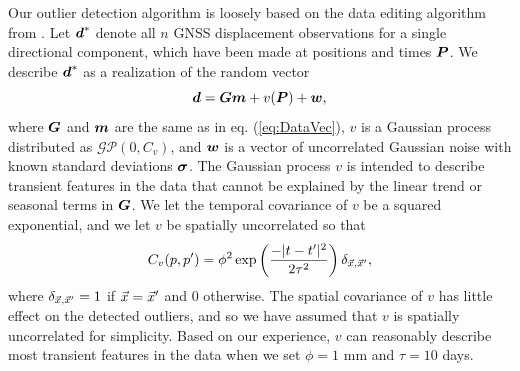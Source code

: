 \documentclass[extra,mreferee]{gji}
\begin{document}
Our outlier detection algorithm is loosely based on the data editing
algorithm from \citet{Acheson1975}. Let $\data^*$ denote all $n$ GNSS
displacement observations for a single directional component, which
have been made at positions and times $\points$.  We describe
$\data^*$ as a realization of the random vector
\begin{equation}\label{eq:OutlierDataVec}
\data = \G\mitbf{m} + v(\points) + \mitbf{w},
\end{equation}
where $\G$ and $\mitbf{m}$ are the same as in eq. (\ref{eq:DataVec}),
$v$ is a Gaussian process distributed as $\mathcal{GP}(0,C_v)$, and
$\mitbf{w}$ is a vector of uncorrelated Gaussian noise with known
standard deviations $\mitbf{\sigma}$. The Gaussian process $v$ is
intended to describe transient features in the data that cannot be
explained by the linear trend or seasonal terms in $\G$. We let the
temporal covariance of $v$ be a squared exponential, and we let $v$ be
spatially uncorrelated so that
\begin{equation}
C_v(p,p') = \phi^2\exp\left(\frac{-|t - t'|^2}{2\tau^2}\right) \delta_{\vec{x},\vec{x}'},
\end{equation}
where $\delta_{\vec{x},\vec{x}'} = 1$ if $\vec{x} = \vec{x}'$ and $0$ otherwise.
The spatial covariance of $v$ has little effect on the detected
outliers, and so we have assumed that $v$ is spatially uncorrelated
for simplicity. Based on our experience, $v$ can reasonably describe
most transient features in the data when we set $\phi = 1$ mm and
$\tau = 10$ days.
\end{document}
